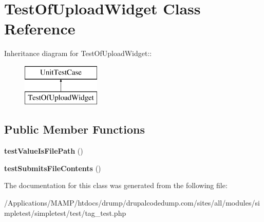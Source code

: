 \hypertarget{class_test_of_upload_widget}{
\section{TestOfUploadWidget Class Reference}
\label{class_test_of_upload_widget}
}
Inheritance diagram for TestOfUploadWidget::\begin{figure}[H]
\begin{center}
\leavevmode
\includegraphics[height=2cm]{class_test_of_upload_widget}
\end{center}
\end{figure}
\subsection*{Public Member Functions}
\begin{DoxyCompactItemize}
\item 
\hypertarget{class_test_of_upload_widget_aed7fc078a0e0b91d5ac92b1c8d7c3629}{
{\bfseries testValueIsFilePath} ()}
\label{class_test_of_upload_widget_aed7fc078a0e0b91d5ac92b1c8d7c3629}

\item 
\hypertarget{class_test_of_upload_widget_a5d0fe84ab174f879f2dc4432910f4665}{
{\bfseries testSubmitsFileContents} ()}
\label{class_test_of_upload_widget_a5d0fe84ab174f879f2dc4432910f4665}

\end{DoxyCompactItemize}


The documentation for this class was generated from the following file:\begin{DoxyCompactItemize}
\item 
/Applications/MAMP/htdocs/drump/drupalcodedump.com/sites/all/modules/simpletest/simpletest/test/tag\_\-test.php\end{DoxyCompactItemize}
